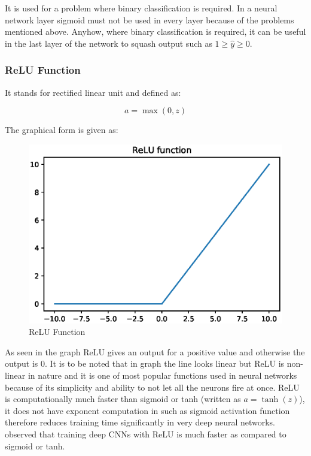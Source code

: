 \documentclass[11pt]{article}
\begin{document}
It is used for a problem where binary classification is required. In a neural network layer sigmoid must not be used in every layer because of the problems mentioned above. Anyhow, where binary classification is required, it can be useful in the last layer of the network to squash output such as $ 1 \geq \hat{y} \geq 0$.

\subsubsection{ReLU Function}
It stands for rectified linear unit and defined as:

\begin{equation}
a = \max (0, z)
\end{equation}

The graphical form is given as:

\begin{figure}[ht!]
	\centering
	\includegraphics[width=.6\linewidth]{files/cnn_architecture/relu.eps}
	\caption{ReLU Function}
	\label{fig: relu}
\end{figure}

As seen in the graph ReLU gives an output for a positive value and otherwise the output is 0. It is to be noted that in graph the line looks linear but ReLU is non-linear in nature and it is one of most popular functions used in neural networks because of its simplicity and ability to not let all the neurons fire at once. ReLU is computationally much faster than sigmoid or tanh (written as $a=\tanh (z)$), it does not have exponent computation in such as sigmoid activation function therefore reduces training time significantly in very deep neural networks. \cite{krizhevsky_imagenet_2012} observed that training deep CNNs with ReLU is much faster as compared to sigmoid or tanh. 
\end{document}
